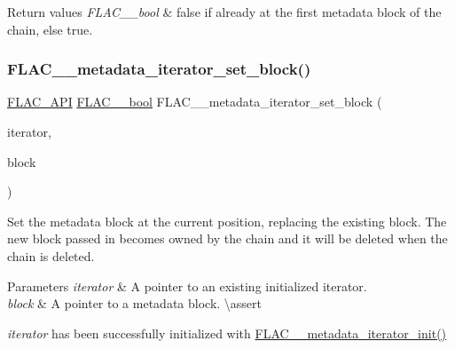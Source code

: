 \begin{DoxyRetVals}{Return values}
{\em F\+L\+A\+C\+\_\+\+\_\+bool} & {\ttfamily false} if already at the first metadata block of the chain, else {\ttfamily true}. \\
\hline
\end{DoxyRetVals}
\mbox{\label{group__flac__metadata__level2_gab40c33a0bf35a2932a5c13f5230e0d9e}} 
\subsubsection{\texorpdfstring{FLAC\_\_metadata\_iterator\_set\_block()}{FLAC\_\_metadata\_iterator\_set\_block()}}
{\footnotesize\ttfamily \mbox{\hyperlink{group__flac__export_ga56ca07df8a23310707732b1c0007d6f5}{F\+L\+A\+C\+\_\+\+A\+PI}} \mbox{\hyperlink{ordinals_8h_a95103469f1cbd78b8cf250194985b34e}{F\+L\+A\+C\+\_\+\+\_\+bool}} F\+L\+A\+C\+\_\+\+\_\+metadata\+\_\+iterator\+\_\+set\+\_\+block (\begin{DoxyParamCaption}\item[{\mbox{\hyperlink{group__flac__metadata__level2_ga9f3e135a07cdef7e51597646aa7b89b2}{F\+L\+A\+C\+\_\+\+\_\+\+Metadata\+\_\+\+Iterator}} $\ast$}]{iterator,  }\item[{\mbox{\hyperlink{struct_f_l_a_c_____stream_metadata}{F\+L\+A\+C\+\_\+\+\_\+\+Stream\+Metadata}} $\ast$}]{block }\end{DoxyParamCaption})}

Set the metadata block at the current position, replacing the existing block. The new block passed in becomes owned by the chain and it will be deleted when the chain is deleted.


\begin{DoxyParams}{Parameters}
{\em iterator} & A pointer to an existing initialized iterator. \\
\hline
{\em block} & A pointer to a metadata block. \textbackslash{}assert 
\begin{DoxyCode}{1}
\end{DoxyCode}
 {\itshape iterator} has been successfully initialized with \mbox{\hyperlink{group__flac__metadata__level2_ga4a5af69a1f19436b02f738eb8c97c959}{F\+L\+A\+C\+\_\+\+\_\+metadata\+\_\+iterator\+\_\+init()}} 
\begin{DoxyCode}{1}
\end{DoxyCode}
 \\
\hline
\end{DoxyParams}

